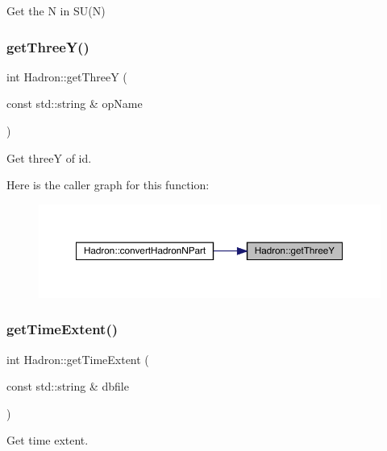Get the N in S\+U(\+N) 

\mbox{\label{namespaceHadron_a8739169b4caffa5f8bab802592b3302a}} 
\subsubsection{\texorpdfstring{getThreeY()}{getThreeY()}}
{\footnotesize\ttfamily int Hadron\+::get\+ThreeY (\begin{DoxyParamCaption}\item[{const std\+::string \&}]{op\+Name }\end{DoxyParamCaption})}



Get threeY of id. 

Here is the caller graph for this function\+:\nopagebreak
\begin{figure}[H]
\begin{center}
\leavevmode
\includegraphics[width=350pt]{d1/daf/namespaceHadron_a8739169b4caffa5f8bab802592b3302a_icgraph}
\end{center}
\end{figure}
\mbox{\label{namespaceHadron_a660c9f3adc1525c9d326b23398d09494}} 
\subsubsection{\texorpdfstring{getTimeExtent()}{getTimeExtent()}}
{\footnotesize\ttfamily int Hadron\+::get\+Time\+Extent (\begin{DoxyParamCaption}\item[{const std\+::string \&}]{dbfile }\end{DoxyParamCaption})}



Get time extent. 

